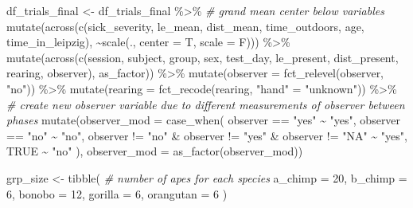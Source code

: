 \documentclass[
]{article}
\newenvironment{Shaded}{\begin{snugshade}}{\end{snugshade}}
\newcommand{\AttributeTok}[1]{\textcolor[rgb]{0.77,0.63,0.00}{#1}}
\newcommand{\CommentTok}[1]{\textcolor[rgb]{0.56,0.35,0.01}{\textit{#1}}}
\newcommand{\ConstantTok}[1]{\textcolor[rgb]{0.00,0.00,0.00}{#1}}
\newcommand{\DecValTok}[1]{\textcolor[rgb]{0.00,0.00,0.81}{#1}}
\newcommand{\FunctionTok}[1]{\textcolor[rgb]{0.00,0.00,0.00}{#1}}
\newcommand{\NormalTok}[1]{#1}
\newcommand{\OtherTok}[1]{\textcolor[rgb]{0.56,0.35,0.01}{#1}}
\newcommand{\SpecialCharTok}[1]{\textcolor[rgb]{0.00,0.00,0.00}{#1}}
\newcommand{\StringTok}[1]{\textcolor[rgb]{0.31,0.60,0.02}{#1}}
\begin{document}
\begin{Shaded}
\begin{Highlighting}[]
\NormalTok{df\_trials\_final }\OtherTok{\textless{}{-}}\NormalTok{ df\_trials\_final }\SpecialCharTok{\%\textgreater{}\%} 
  \CommentTok{\# grand mean center below variables}
  \FunctionTok{mutate}\NormalTok{(}\FunctionTok{across}\NormalTok{(}\FunctionTok{c}\NormalTok{(sick\_severity, }
\NormalTok{                  le\_mean, }
\NormalTok{                  dist\_mean, }
\NormalTok{                  time\_outdoors, }
\NormalTok{                  age, }
\NormalTok{                  time\_in\_leipzig), }
                \SpecialCharTok{\textasciitilde{}}\FunctionTok{scale}\NormalTok{(., }\AttributeTok{center =}\NormalTok{ T, }\AttributeTok{scale =}\NormalTok{ F))) }\SpecialCharTok{\%\textgreater{}\%} 
  \FunctionTok{mutate}\NormalTok{(}\FunctionTok{across}\NormalTok{(}\FunctionTok{c}\NormalTok{(session, }
\NormalTok{                  subject, }
\NormalTok{                  group, }
\NormalTok{                  sex,}
\NormalTok{                  test\_day, }
\NormalTok{                  le\_present, }
\NormalTok{                  dist\_present,}
\NormalTok{                  rearing,}
\NormalTok{                  observer), }
\NormalTok{                as\_factor)) }\SpecialCharTok{\%\textgreater{}\%} 
  \FunctionTok{mutate}\NormalTok{(}\AttributeTok{observer =} \FunctionTok{fct\_relevel}\NormalTok{(observer, }\StringTok{"no"}\NormalTok{)) }\SpecialCharTok{\%\textgreater{}\%} 
  \FunctionTok{mutate}\NormalTok{(}\AttributeTok{rearing =} \FunctionTok{fct\_recode}\NormalTok{(rearing, }\StringTok{"hand"} \OtherTok{=} \StringTok{"unknown"}\NormalTok{)) }\SpecialCharTok{\%\textgreater{}\%} 
  \CommentTok{\# create new observer variable due to different measurements of observer between phases}
  \FunctionTok{mutate}\NormalTok{(}\AttributeTok{observer\_mod =} \FunctionTok{case\_when}\NormalTok{(}
\NormalTok{    observer }\SpecialCharTok{==} \StringTok{"yes"} \SpecialCharTok{\textasciitilde{}} \StringTok{"yes"}\NormalTok{,}
\NormalTok{    observer }\SpecialCharTok{==} \StringTok{"no"} \SpecialCharTok{\textasciitilde{}} \StringTok{"no"}\NormalTok{,}
\NormalTok{    observer }\SpecialCharTok{!=} \StringTok{"no"} \SpecialCharTok{\&}\NormalTok{ observer }\SpecialCharTok{!=} \StringTok{"yes"} \SpecialCharTok{\&}\NormalTok{ observer }\SpecialCharTok{!=} \StringTok{"NA"} \SpecialCharTok{\textasciitilde{}} \StringTok{"yes"}\NormalTok{,}
    \ConstantTok{TRUE} \SpecialCharTok{\textasciitilde{}} \StringTok{"no"}
\NormalTok{  ), }\AttributeTok{observer\_mod =}  \FunctionTok{as\_factor}\NormalTok{(observer\_mod))}

\NormalTok{grp\_size }\OtherTok{\textless{}{-}} \FunctionTok{tibble}\NormalTok{(}
  \CommentTok{\# number of apes for each species}
  \AttributeTok{a\_chimp =} \DecValTok{20}\NormalTok{,}
  \AttributeTok{b\_chimp =} \DecValTok{6}\NormalTok{,}
  \AttributeTok{bonobo =} \DecValTok{12}\NormalTok{,}
  \AttributeTok{gorilla =} \DecValTok{6}\NormalTok{,}
  \AttributeTok{orangutan =} \DecValTok{6}
\NormalTok{)}


\end{Highlighting}
\end{Shaded}
\end{document}
